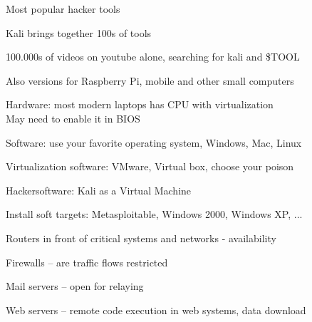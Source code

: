 \documentclass[Screen16to9,17pt]{foils}
\begin{document}
\vskip 5mm
\centerline{Most popular hacker tools }





\begin{list1}
\item  Kali  brings together 100s of tools
\item 100.000s of videos on youtube alone, searching for kali and \$TOOL
\item Also versions for Raspberry Pi, mobile and other small computers
\end{list1}



\begin{list2}
\item Hardware: most modern laptops has CPU with virtualization \\
May need to enable it in BIOS
\item Software: use your favorite operating system, Windows, Mac, Linux
\item Virtualization software: VMware, Virtual box, choose your poison
\item Hackersoftware: Kali as a Virtual Machine 
\item Install soft targets: Metasploitable, Windows 2000, Windows XP, ...
\end{list2}





\begin{list2}
\item Routers in front of critical systems and networks - availability
\item Firewalls -- are traffic flows restricted
\item Mail servers -- open for relaying
\item Web servers -- remote code execution in web systems, data download
\end{list2}
\end{document}
